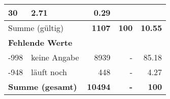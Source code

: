 \begin{longtable}{lXrrr}
       \num{30} &
       \num[round-mode=places,round-precision=2]{2.71} &
         \num[round-mode=places,round-precision=2]{0.29} \\
     \midrule
     \multicolumn{2}{l}{Summe (gültig)} &
       \textbf{\num{1107}} &
     \textbf{\num{100}} &
       \textbf{\num[round-mode=places,round-precision=2]{10.55}} \\
     \multicolumn{5}{l}{\textbf{Fehlende Werte}}\\
       -998 &
       keine Angabe &
         \num{8939} &
        - &
         \num[round-mode=places,round-precision=2]{85.18} \\
       -948 &
       läuft noch &
         \num{448} &
        - &
         \num[round-mode=places,round-precision=2]{4.27} \\
     \midrule
     \multicolumn{2}{l}{\textbf{Summe (gesamt)}} &
          \textbf{\num{10494}} &
        \textbf{-} &
        \textbf{\num{100}} \\
     \bottomrule
     \end{longtable}
     
